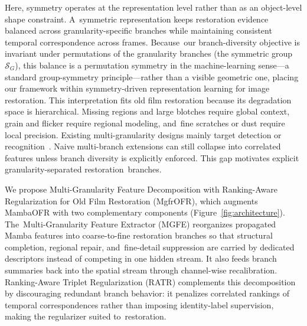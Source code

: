 \documentclass[symmetry,article,accept,pdftex,moreauthors]{Definitions/mdpi}
\begin{document}
Here, symmetry operates at the representation level rather than as an object-level shape constraint. A~symmetric representation keeps restoration evidence balanced across granularity-specific branches while maintaining consistent temporal correspondence across frames. Because~our branch-diversity objective is invariant under permutations of the granularity branches (the symmetric group $\mathcal{S}_G$), this balance is a permutation symmetry in the machine-learning sense---a standard group-symmetry principle---rather than a visible geometric one, placing our framework within symmetry-driven representation learning for image restoration. This interpretation fits old film restoration because its degradation space is hierarchical. Missing regions and large blotches require global context, grain and flicker require regional modeling, and~fine scratches or dust require local precision. Existing multi-granularity designs mainly target detection or recognition~\cite{lin2017fpn,wang2021hrnet,sun2018pcb,wang2018mgn,gu2025reidmamba}. Naive multi-branch extensions can still collapse into correlated features unless branch diversity is explicitly enforced. This gap motivates explicit granularity-separated restoration~branches.

We propose Multi-Granularity Feature Decomposition with Ranking-Aware Regularization for Old Film Restoration (MgfrOFR), which augments MambaOFR with two complementary components (Figure~\ref{fig:architecture}). The~Multi-Granularity Feature Extractor (MGFE) reorganizes propagated Mamba features into coarse-to-fine restoration branches so that structural completion, regional repair, and~fine-detail suppression are carried by dedicated descriptors instead of competing in one hidden stream. It also feeds branch summaries back into the spatial stream through channel-wise recalibration. Ranking-Aware Triplet Regularization (RATR) complements this decomposition by discouraging redundant branch behavior: it penalizes correlated rankings of temporal correspondences rather than imposing identity-label supervision, making the regularizer suited to~restoration.
\end{document}
